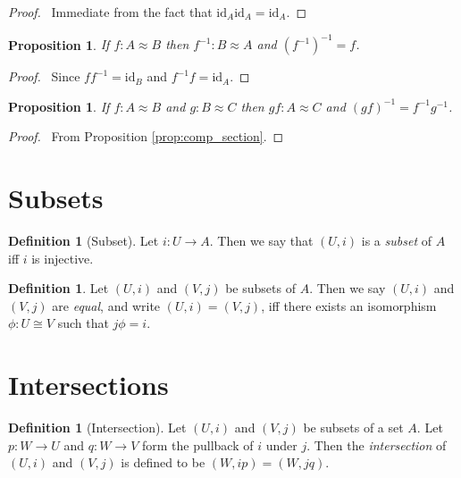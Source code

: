 \documentclass{book}
\let\qed\relax
\newtheorem{prop}[ax]{Proposition}
\theoremstyle{definition}
\newtheorem{df}[ax]{Definition}
\newcommand{\id}[1]{\ensuremath{\mathrm{id}_{#1}}}
\newcommand{\inv}[1]{\ensuremath{{#1}^{-1}}}
\begin{document}
\begin{proof}
\pf\ Immediate from the fact that $\id{A} \id{A} = \id{A}$. \qed
\end{proof}

\begin{prop}
If $f : A \approx B$ then $\inv{f} : B \approx A$ and $\inv{(\inv{f})} = f$.
\end{prop}

\begin{proof}
\pf\ Since $f \inv{f} = \id{B}$ and $\inv{f} f = \id{A}$. \qed
\end{proof}

\begin{prop}
If $f : A \approx B$ and $g : B \approx C$ then $gf : A \approx C$ and $\inv{(gf)} = \inv{f} \inv{g}$.
\end{prop}

\begin{proof}
\pf\ From Proposition \ref{prop:comp_section}. \qed
\end{proof}

\section{Subsets}

\begin{df}[Subset]
Let $i : U \rightarrow A$. Then we say that $(U,i)$ is a \emph{subset} of $A$ iff $i$ is injective.
\end{df}

\begin{df}
Let $(U,i)$ and $(V,j)$ be subsets of $A$. Then we say $(U,i)$ and $(V,j)$ are \emph{equal}, and write $(U,i) = (V,j)$, iff there exists an isomorphism $\phi : U \cong V$ such that $j \phi = i$.
\end{df}



\section{Intersections}

\begin{df}[Intersection]
Let $(U,i)$ and $(V,j)$ be subsets of a set $A$. 
Let $p : W \rightarrow U$ and $q : W \rightarrow V$ form the pullback of $i$ under $j$. Then
the \emph{intersection} of $(U,i)$ and $(V,j)$ is defined to be $(W, ip) = (W, jq)$.
\end{df}
\end{document}
